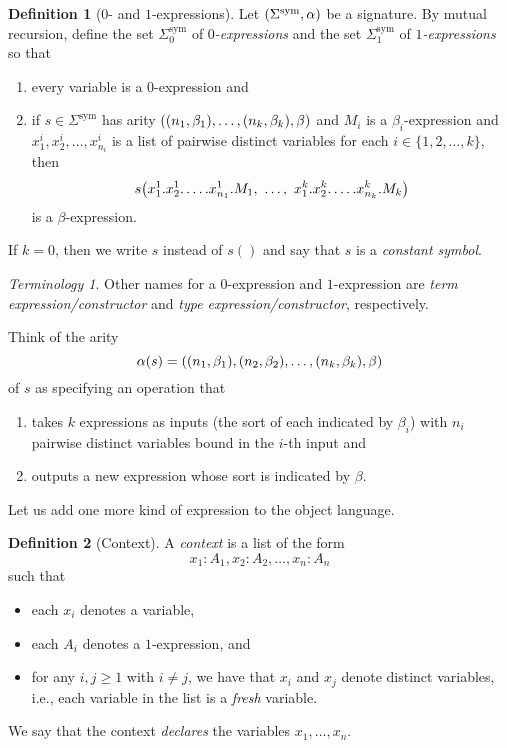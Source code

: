 \documentclass[10pt,letterpaper,cm]{nupset}
\theoremstyle{definition}
\newtheorem{definition}{Definition}[subsection]
\theoremstyle{theorem}
\theoremstyle{remark}
\newtheorem*{term}{Terminology}
\DeclareMathOperator{\sym}{sym}
\newcommand{\0}{\mathbf{0}}
\newcommand{\1}{\mathbf{1}}
\newcommand{\2}{\mathbf{2}}
\newcommand{\bi}{\begin{itemize}}
\newcommand{\ei}{\end{itemize}}
\newcommand{\be}{\begin{enumerate}}
\newcommand{\ee}{\end{enumerate}}
\begin{document}
\begin{definition}[$0$- and $1$-expressions]
Let $\mleft(\Sigma^{\sym}, \alpha\mright)$ be a signature. By mutual recursion, define the set $\Sigma_0^{\sym}$ of \textit{$0$-expressions} and the set $\Sigma_1^{\sym}$ of \textit{$1$-expressions} so that
\be[label =(\roman*)]
\item every variable is a $0$-expression and
\item if $s\in \Sigma^{\sym}$ has arity $\mleft(\mleft(n_{1}, \beta_{1}\mright), \ldots,\mleft(n_{k}, \beta_{k}\mright), \beta\mright)$ and $M_i$ is a $\beta_i$-expression and $x^i_1, x^i_2, \ldots, x^i_{n_i}$ is a list of pairwise distinct variables for each $i \in \{1, 2, \ldots, k\}$, then 
$$
s\mleft(x^1_1.x^1_2.\ldots.x^1_{n_1}.M_{1},\ \ldots,\  x^k_1.x^k_2.\ldots.x^k_{n_k}.M_{k}\mright)
$$
is a $\beta$-expression.
\ee
If $k=0$, then we write $s$ instead of $s()$ and say that $s$ is a \textit{constant symbol}.
\end{definition}

\begin{term}
Other names for a $0$-expression and $1$-expression are \textit{term expression/constructor} and \textit{type expression/constructor}, respectively.
\end{term}

\medskip

Think of the arity $$\alpha(s) = \mleft(\mleft(n_{1}, \beta_{1}\mright),\mleft(n_{2}, \beta_{2}\mright), \ldots,\mleft(n_{k}, \beta_{k}\mright), \beta\mright)$$ of $s$ as specifying an operation that 
\be[label=(\alph*)]
\item
takes $k$ expressions as inputs (the sort of each indicated by $\beta_i$) with $n_i$ pairwise distinct variables bound in the $i$-th input  and 
\item outputs a new expression whose sort is indicated by $\beta$. 
\ee

\medskip

Let us add one more kind of expression to the object language.

\begin{definition}[Context]
A \textit{context} is a list of the form 
\[
 x_{1} : A_{1}, x_{2} : A_{2},\ldots, x_{n} : A_{n} 
\] such that 
\bi
\item each $x_i$ denotes a variable,
\item each $A_i$ denotes a $1$-expression, and
 \item for any $i, j\geq 1$ with $i\ne j$, we have that $x_i$ and $x_j$ denote distinct variables, i.e., each variable in the list is a \textit{fresh} variable.
 \ei
  We say that the context \textit{declares} the variables $x_1, \ldots, x_n$.
\end{definition}
\end{document}
